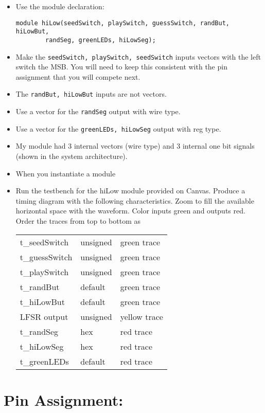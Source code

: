 \begin{itemize}
\item
  Use the module declaration:

\begin{verbatim}
module hiLow(seedSwitch, playSwitch, guessSwitch, randBut, hiLowBut,
		randSeg, greenLEDs, hiLowSeg); 
\end{verbatim}

\item
  Make the \verb+seedSwitch, playSwitch, seedSwitch+ inputs vectors with the
  left switch the MSB. You will need to keep this consistent with the
  pin assignment that you will compete next.
\item
  The \verb+randBut, hiLowBut+ inputs are not vectors.
\item
  Use a vector for the \verb+randSeg+ output with wire type.
\item
  Use a vector for the \verb+greenLEDs, hiLowSeg+ output with reg type.
\item
  My module had 3 internal vectors (wire type) and 3 internal one bit
  signals (shown in the system architecture).
\item
  When you instantiate a module
\item
  Run the testbench for the hiLow module provided on Canvas. Produce a
  timing diagram with the following characteristics. Zoom to fill the
  available horizontal space with the waveform. Color inputs green and
  outputs red. Order the traces from top to bottom as

\begin{tabular}{p{4cm}p{4cm}p{4cm}}
    t\_seedSwitch & unsigned  & green trace \\
    t\_guessSwitch & unsigned & green trace \\
    t\_playSwitch & unsigned & green trace \\
    t\_randBut & default & green trace \\
    t\_hiLowBut & default & green trace \\
    LFSR output & unsigned & yellow trace\\
    t\_randSeg & hex & red trace \\
    t\_hiLowSeg & hex & red trace \\
    t\_greenLEDs & default & red trace \\
  \end{tabular}
\end{itemize}


\hypertarget{pin-assignment}{%
\section{Pin Assignment:}\label{pin-assignment}}

